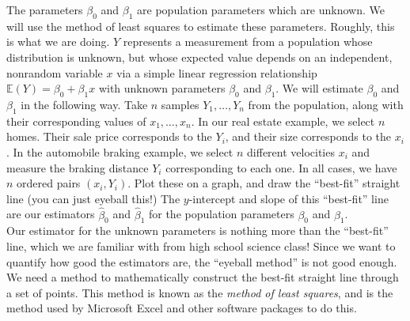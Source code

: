 \documentclass[12pt]{article}
\theoremstyle{definition}
\theoremstyle{remark}
\def\E{{\mathbb E}}
\begin{document}
The parameters $\beta_0$ and $\beta_1$ are population parameters which are unknown. We will use the method of least squares to estimate these parameters. Roughly, this is what we are doing. $Y$ represents a measurement from a population whose distribution is unknown, but whose expected value depends on an independent, nonrandom variable $x$ via a simple linear regression relationship $\E(Y) = \beta_0 + \beta_1 x$ with unknown parameters $\beta_0$ and $\beta_1$. We will estimate $\beta_0$ and $\beta_1$ in the following way. Take $n$ samples $Y_1, \dots, Y_n$ from the population, along with their corresponding values of $x_1, \dots, x_n$. In our real estate example, we select $n$ homes. Their sale price corresponds to the $Y_i$, and their size corresponds to the $x_i$. In the automobile braking example, we select $n$ different velocities $x_i$ and measure the braking distance $Y_i$ corresponding to each one. In all cases, we have $n$ ordered pairs $(x_i, Y_i)$. Plot these on a graph, and draw the ``best-fit'' straight line (you can just eyeball this!) The $y$-intercept and slope of this ``best-fit'' line are our estimators $\hat{\beta}_0$ and $\hat{\beta}_1$ for the population parameters $\beta_0$ and $\beta_1$. \\

Our estimator for the unknown parameters is nothing more than the ``best-fit'' line, which we are familiar with from high school science class! Since we want to quantify how good the estimators are, the ``eyeball method'' is not good enough. We need a method to mathematically construct the best-fit straight line through a set of points. This method is known as the \emph{method of least squares}, and is the method used by Microsoft Excel and other software packages to do this.
\end{document}
